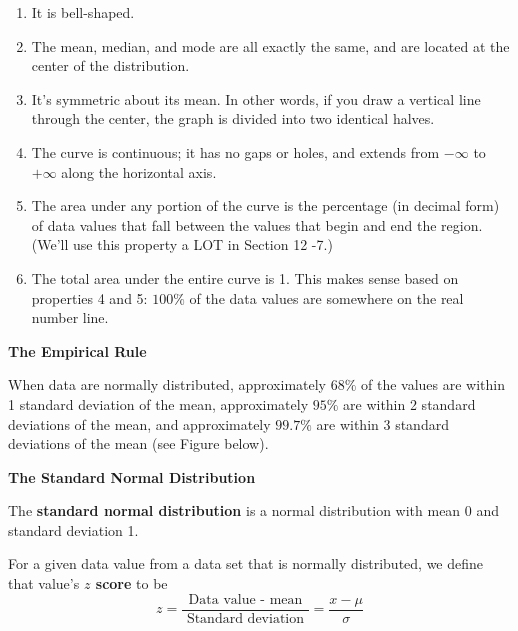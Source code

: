 \documentclass[english,lecture,12pt]{gWmaths}
\begin{document}
\begin{enumerate}[1.]
\item It is bell-shaped.
\item The mean, median, and mode are all exactly the same, and are located at the center of the distribution.
\item It's symmetric about its mean. In other words, if you draw a vertical line through the center, the graph is divided into two identical halves.
\item The curve is continuous; it has no gaps or holes, and extends from $-\infty$ to $+\infty$ along the horizontal axis.
\item The area under any portion of the curve is the percentage (in decimal form) of data values that fall between the values that begin and end the region. (We'll use this property a LOT in Section 12 -7.)
\item The total area under the entire curve is 1. This makes sense based on properties 4 and 5: $100\%$ of the data values are somewhere on the real number line.
\end{enumerate}

\vspace{1 in}

\noindent
\textbf{The Empirical Rule}\\

\begin{Def}
When data are normally distributed, approximately $68\%$ of the values are within 1 standard deviation of the mean, approximately $95\%$ are within 2 standard deviations of the mean, and approximately $99.7\%$ are within 3 standard deviations of the mean (see Figure below).\\
\end{Def}




\noindent
\textbf{The Standard Normal Distribution}\\

\begin{Def}
The \textbf{standard normal distribution} is a normal distribution with mean 0 and standard deviation 1. \\
\end{Def}


\noindent
For a given data value from a data set that is normally distributed, we define that value's \textbf{$z$ score} to be\\ $$z = \frac{\text{ Data value - mean } }{\text{ Standard deviation }} = \frac{x - \mu}{\sigma}$$ \\
\end{document}
